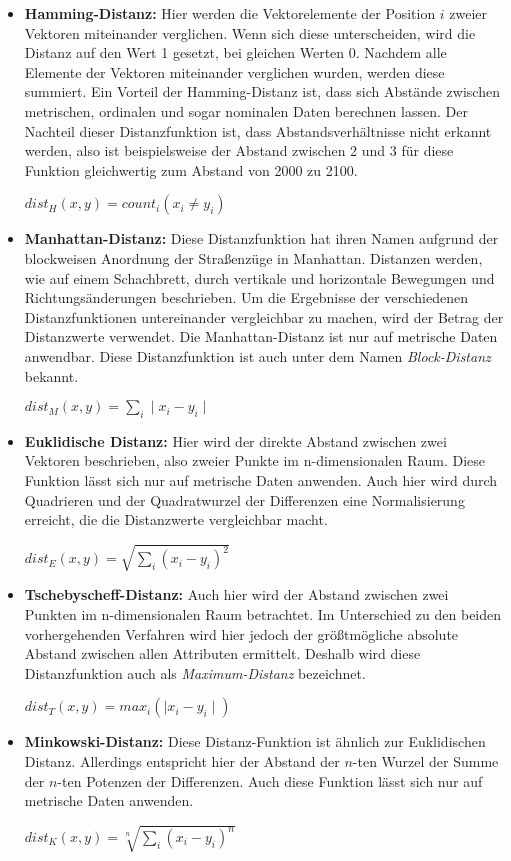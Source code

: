 \begin{itemize}
\item \textbf{Hamming-Distanz:} Hier werden die Vektorelemente der Position \(i\) zweier Vektoren miteinander verglichen. Wenn sich diese unterscheiden, wird die Distanz auf den Wert 1 gesetzt, bei gleichen Werten 0. Nachdem alle Elemente der Vektoren miteinander verglichen wurden, werden diese summiert. Ein Vorteil der Hamming-Distanz ist, dass sich Abstände zwischen metrischen, ordinalen und sogar nominalen Daten berechnen lassen. Der Nachteil dieser Distanzfunktion ist, dass Abstandsverhältnisse nicht erkannt werden, also ist beispielsweise der Abstand zwischen 2 und 3 für diese Funktion gleichwertig zum Abstand von 2000 zu 2100.

\(dist_H(x,y) = count_i(x_i \neq y_i) \)

\item \textbf{Manhattan-Distanz:} Diese Distanzfunktion hat ihren Namen aufgrund der blockweisen Anordnung der Straßenzüge in Manhattan. Distanzen werden, wie auf einem Schachbrett, durch vertikale und horizontale Bewegungen und Richtungsänderungen beschrieben. Um die Ergebnisse der verschiedenen Distanzfunktionen untereinander vergleichbar zu machen, wird der Betrag der Distanzwerte verwendet. Die Manhattan-Distanz ist nur auf metrische Daten anwendbar. Diese Distanzfunktion ist auch unter dem Namen \textit{Block-Distanz} bekannt.   

\(dist_M(x,y) = \sum_{i} \mid x_i - y_i \mid \)


\item \textbf{Euklidische Distanz:} Hier wird der direkte Abstand zwischen zwei Vektoren beschrieben, also zweier Punkte im n-dimensionalen Raum. Diese Funktion lässt sich nur auf metrische Daten anwenden. Auch hier wird durch Quadrieren und der Quadratwurzel der Differenzen eine Normalisierung erreicht, die die Distanzwerte vergleichbar macht. 

\(dist_E(x,y) = \sqrt{\sum_{i}(x_i - y_i)^2} \)

\item \textbf{Tschebyscheff-Distanz:}  Auch hier wird der Abstand zwischen zwei Punkten im n-dimensionalen Raum betrachtet. Im Unterschied zu den beiden vorhergehenden Verfahren wird hier jedoch der größtmögliche absolute Abstand zwischen allen Attributen ermittelt. Deshalb wird diese Distanzfunktion auch als \textit{Maximum-Distanz}  bezeichnet. 

\(dist_T(x,y) = max_i(\mid x_i - y_i \mid) \)

\item \textbf{Minkowski-Distanz:}  Diese Distanz-Funktion ist ähnlich zur Euklidischen Distanz. Allerdings entspricht hier der Abstand der \(n\)-ten Wurzel der Summe der  \(n\)-ten Potenzen der Differenzen. Auch diese Funktion lässt sich nur auf metrische Daten anwenden.

\(dist_K(x,y) = \sqrt[n]{\sum_{i}(x_i - y_i)^n} \)

\end{itemize}

